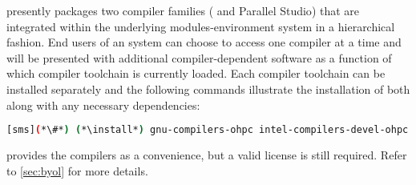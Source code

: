 \OHPC{} presently packages two compiler families ({\GNU{}} and {\IntelR{}
  Parallel Studio}) that are integrated within the underlying
modules-environment system in a hierarchical fashion. End users of an \OHPC{}
system can choose to access one compiler at a time and will be presented with
additional compiler-dependent software as a function of which compiler
toolchain is currently loaded. Each compiler toolchain can be installed
separately and the following commands illustrate the installation of both along
with any necessary dependencies:

\begin{lstlisting}[language=bash]
[sms](*\#*) (*\install*) gnu-compilers-ohpc intel-compilers-devel-ohpc
\end{lstlisting}

\begin{center}
\begin{tcolorbox}[]
\small
\OHPC{} provides the \IntelR compilers as a convenience, but a valid license
is still required. Refer to \ref{sec:byol} for more details.
\end{tcolorbox}
\end{center}
